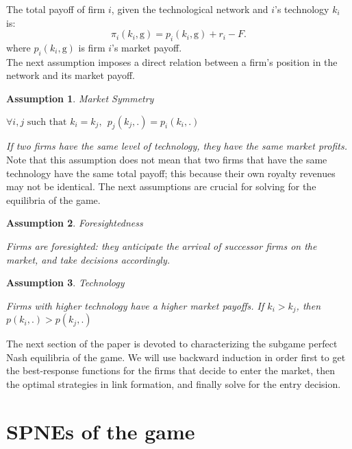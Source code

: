 \documentclass{article}
\newtheorem{assumption}{Assumption}
\begin{document}
\indent The total payoff of firm $i$, given the technological network  and $i$'s technology $k_i$ is: 
\begin{equation}
    \pi_i(k_i,\text{g})=p_i(k_i,\text{g})+r_i -F. 
\end{equation}
where $p_i(k_i,\text{g})$ is firm $i$'s market payoff. \\

\indent The next assumption imposes a direct relation between a firm's position in the network and its market payoff.\\  

\begin{assumption}{Market Symmetry} \label{ass1}

$ \forall i, j \text{ such that } k_i=k_j,~~ p_j(k_j,.)= p_i(k_i,.)$
\end{assumption}
\textit{If two firms have the same level of technology, they have the same market profits.}\\ 

Note that this assumption does not mean that two firms that have the same technology have the same total payoff; this because their own royalty revenues may not be identical. The next assumptions are crucial for solving for the equilibria of the game. \\

\begin{assumption}{Foresightedness} \label{ass2}

Firms are foresighted: they anticipate the arrival of successor firms on the market, and take decisions accordingly.  
\end{assumption}

\begin{assumption}{Technology} \label{ass3}

Firms with higher technology have a higher market payoffs. If $k_i>k_j$, then $p(k_i,.)>p(k_j,.)$
\end{assumption}


\indent The next section of the paper is devoted to characterizing the subgame perfect Nash equilibria of the game. We will use backward induction in order first to get the best-response functions for the firms that decide to enter the market, then the optimal strategies in link formation, and finally solve for the entry decision. 

\section{SPNEs of the game }
\end{document}
